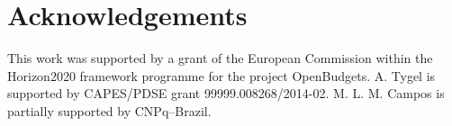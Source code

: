 \documentclass[conference]{IEEEtran}
\begin{document}

\section*{Acknowledgements}

This work was supported by a grant of the European Commission within the Horizon2020 framework programme for the project OpenBudgets.
A. Tygel is supported by CAPES/PDSE grant 99999.008268/2014-02. 
M. L. M. Campos is partially supported by CNPq--Brazil.



%
\end{document}
